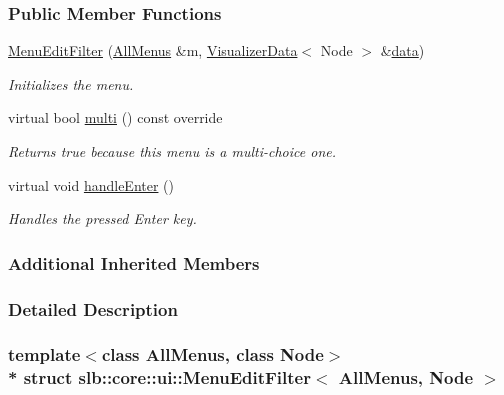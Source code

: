 \subsubsection*{Public Member Functions}
\begin{DoxyCompactItemize}
\item 
\hyperlink{structslb_1_1core_1_1ui_1_1MenuEditFilter_ab60fd8c451f43b875b29e36fd17263ea}{Menu\+Edit\+Filter} (\hyperlink{structslb_1_1core_1_1ui_1_1AllMenus}{All\+Menus} \&m, \hyperlink{structslb_1_1core_1_1ui_1_1VisualizerData}{Visualizer\+Data}$<$ Node $>$ \&\hyperlink{structslb_1_1core_1_1ui_1_1MenuBase_a475d9457affb2b4fc96737e269d6911f}{data})
\begin{DoxyCompactList}\small\item\em Initializes the menu. \end{DoxyCompactList}\item 
virtual bool \hyperlink{structslb_1_1core_1_1ui_1_1MenuEditFilter_aa8f24e2a278602477502f291c9d05dd4}{multi} () const override
\begin{DoxyCompactList}\small\item\em Returns {\ttfamily true} because this menu is a multi-\/choice one. \end{DoxyCompactList}\item 
virtual void \hyperlink{structslb_1_1core_1_1ui_1_1MenuEditFilter_ac7c3d8f360006a7991605134a64ec7c7}{handle\+Enter} ()\hypertarget{structslb_1_1core_1_1ui_1_1MenuEditFilter_ac7c3d8f360006a7991605134a64ec7c7}{}\label{structslb_1_1core_1_1ui_1_1MenuEditFilter_ac7c3d8f360006a7991605134a64ec7c7}

\begin{DoxyCompactList}\small\item\em Handles the pressed Enter key. \end{DoxyCompactList}\end{DoxyCompactItemize}
\subsubsection*{Additional Inherited Members}


\subsubsection{Detailed Description}
\subsubsection*{template$<$class All\+Menus, class Node$>$\\*
struct slb\+::core\+::ui\+::\+Menu\+Edit\+Filter$<$ All\+Menus, Node $>$}

